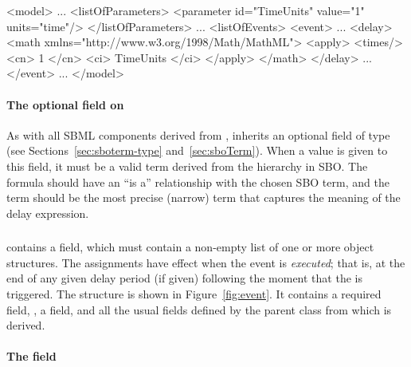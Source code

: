 \begin{blockChanged}
\begin{example}
<model>
    ...
    <listOfParameters>
        <parameter id="TimeUnits" value="1" units="time"/>
    </listOfParameters>
    ...
    <listOfEvents>
        <event>
            ...
            <delay>
                <math xmlns="http://www.w3.org/1998/Math/MathML">
                    <apply>
                        <times/>
                        <cn> 1 </cn>
                        <ci> TimeUnits </ci>
                    </apply>
                </math>
            </delay>
            ...
        </event>
    ...
</model>
\end{example}


\paragraph{The optional  field on }

As with all SBML components derived from \SBase, \Delay inherits
an optional  field of type  (see
Sections~\ref{sec:sboterm-type} and~\ref{sec:sboTerm}).  When a
value is given to this field, it must be a valid term derived from
the \sbomathformula hierarchy in SBO.  The \Delay formula should
have an ``is a'' relationship with the chosen SBO term, and the
term should be the most precise (narrow) term that captures the
meaning of the delay expression.



\subsubsection{}
\label{sec:eventassignment-sboterm}

\Event contains a  field, which must
contain a non-empty list of one or more \EventAssignment object
structures.  The assignments have effect when the event is
\emph{executed}; that is, at the end of any given delay period (if
given) following the moment that the \Event is triggered.  The
\EventAssignment structure is shown in Figure~\ref{fig:event}.  It
contains a required field, , a  field,
and all the usual fields defined by the parent class \SBase from
which \EventAssignment is derived.

\end{blockChanged}

\paragraph{The  field}

